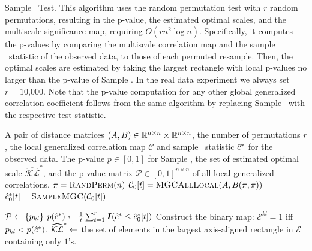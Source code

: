 \documentclass[11pt]{article}
\begin{document}
\clearpage

\begin{algorithm}
\caption{Sample \Mgc~Test. 
This algorithm uses the random permutation test with $r$ random permutations, resulting in the p-value, the estimated optimal scales, and the multiscale significance map, requiring $O(rn^2 \log n)$. Specifically, it computes the p-values by comparing the multiscale correlation map and the sample \Mgc~statistic of the observed data, to those of each permuted resample.  Then, the optimal scales are estimated by taking the largest rectangle with local p-values no larger than the p-value of Sample \Mgc.  In the real data experiment we always set $r=10$,$000$. Note that the p-value computation for any other global generalized correlation coefficient follows from the same algorithm by replacing Sample \Mgc~with the respective test statistic.
}
\label{alg:pval}
\begin{algorithmic}[1]
\Require A pair of distance matrices $(A, B) \in \mathbb{R}^{n \times n} \times \mathbb{R}^{n \times n}$, the number of permutations $r$, the local generalized correlation map $\mathcal{C}$ and sample \Mgc~statistic $\hat{c}^*$ for the observed data.
\Ensure The p-value $p \in [0,1]$ for Sample \Mgc, the set of estimated optimal scale $\widehat{\mathcal{KL}}^{*}$, and the p-value matrix $\mathcal{P} \in [0,1]^{n \times n}$ of all local generalized correlations.
\State $\pi=\textsc{RandPerm}(n)$  
\State $\mathcal{C}_{0}[t]=\textsc{MGCAllLocal}(A, B(\pi,\pi))$ 
\State $\hat{c}^{*}_{0}[t]=\textsc{SampleMGC}(\mathcal{C}_{0}[t])$ 
\EndFor

  $\mathcal{P} \leftarrow \{ p_{kl} \}$
\State $p(\hat{c}^*) \leftarrow \frac{1}{t}\sum_{t=1}^{r}\boldsymbol{I}(\hat{c}^{*} \leq \hat{c}^{*}_{0}[t])$  
\State Construct the binary map:    $\mathcal{E}^{kl} = 1 $ iff $  p_{kl} < p(\hat{c}^*)$. 
\State $\widehat{\mathcal{KL}}^{*} \leftarrow $ the set of elements in the largest axis-aligned rectangle in $\mathcal{E}$ containing only $1$'s.

\EndFunction
\end{algorithmic}
\end{algorithm}
\end{document}
